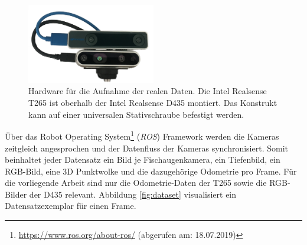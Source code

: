 \begin{figure}[H]
	\centering
	\includegraphics[width=0.5\textwidth]{images/real_dataset/t265_d435_2.png}
	\caption{Hardware für die Aufnahme der realen Daten. Die Intel Realsense T265 ist oberhalb der Intel Realsense D435 montiert. Das Konstrukt kann auf einer universalen Stativschraube befestigt werden.  }
	\label{fig:t265_d435}
\end{figure}

Über das Robot Operating System\footnote{\url{https://www.ros.org/about-ros/} (abgerufen am: 18.07.2019)} (\textit{ROS}) Framework werden die Kameras zeitgleich angesprochen und der Datenfluss der Kameras synchronisiert. Somit beinhaltet jeder Datensatz ein Bild je Fischaugenkamera, ein Tiefenbild, ein RGB-Bild, eine 3D Punktwolke und die dazugehörige Odometrie pro Frame. Für die vorliegende Arbeit sind nur die Odometrie-Daten der T265 sowie die RGB-Bilder der D435 relevant. Abbildung \ref{fig:dataset} visualisiert ein Datensatzexemplar für einen Frame.

